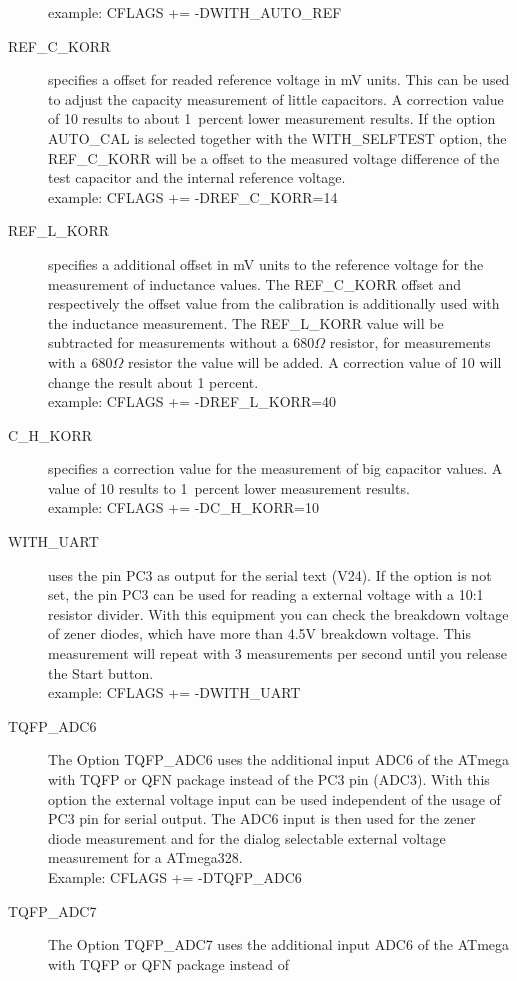 \begin{description}
example:  CFLAGS += -DWITH\_AUTO\_REF
  \item[REF\_C\_KORR] specifies a offset for readed reference voltage in mV units.
This can be used to adjust the capacity measurement of little capacitors.
A correction value of 10 results to about 1~percent lower measurement results.
If the option AUTO\_CAL is selected together with the WITH\_SELFTEST option, the REF\_C\_KORR will be
a offset to the measured voltage difference of the test capacitor and the internal reference voltage.\\
example:  CFLAGS += -DREF\_C\_KORR=14
  \item[REF\_L\_KORR] specifies a additional offset in mV units to the reference voltage for the measurement of
inductance values. 
The REF\_C\_KORR offset and respectively the offset value from the calibration is additionally used with the inductance measurement.
The REF\_L\_KORR value will be subtracted for measurements without a \(680 \Omega\) resistor,
for measurements with a \(680 \Omega\) resistor the value will be added.
A correction value of 10 will change the result about 1 percent.\\
example: CFLAGS += -DREF\_L\_KORR=40
  \item[C\_H\_KORR] specifies a correction value for the measurement of big capacitor values.
A value of 10 results to 1~percent lower measurement results.\\
example:  CFLAGS += -DC\_H\_KORR=10
  \item[WITH\_UART] uses the pin PC3 as output for the serial text (V24).
If the option is not set, the pin PC3 can be used for reading a external voltage with a 10:1 resistor divider.
With this equipment you can check the breakdown voltage of zener diodes, which have more than 4.5V breakdown voltage.
This measurement will repeat with 3 measurements per second until you release the Start button.\\
example: CFLAGS += -DWITH\_UART
  \item[TQFP\_ADC6] The Option TQFP\_ADC6 uses the additional input ADC6 of the ATmega with TQFP or QFN package instead of
the PC3 pin (ADC3).
With this option the external voltage input can be used independent of the usage of PC3 pin for serial output.
The ADC6 input is then used for the zener diode measurement and for the dialog selectable external voltage measurement
for a ATmega328.\\
Example: CFLAGS += -DTQFP\_ADC6
  \item[TQFP\_ADC7] The Option TQFP\_ADC7 uses the additional input ADC6 of the ATmega with TQFP or QFN package instead of

\end{description}
